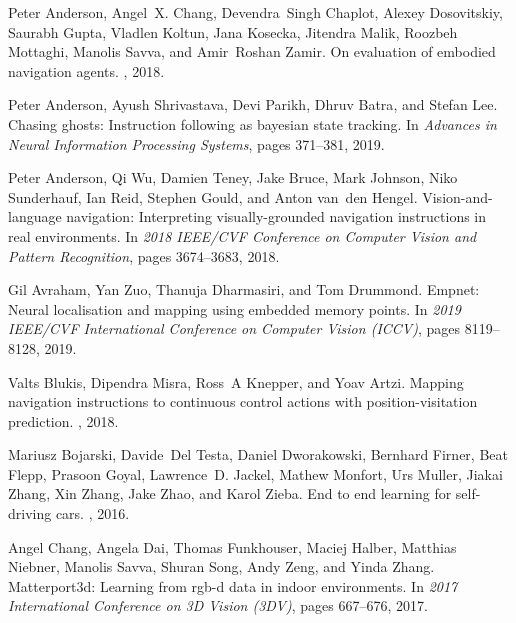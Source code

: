 \documentclass[final]{cvpr}
\begin{document}
\begin{thebibliography}{10}\itemsep=-1pt

    Peter {Anderson}, Angel~X. {Chang}, Devendra~Singh {Chaplot}, Alexey
      {Dosovitskiy}, Saurabh {Gupta}, Vladlen {Koltun}, Jana {Kosecka}, Jitendra
      {Malik}, Roozbeh {Mottaghi}, Manolis {Savva}, and Amir~Roshan {Zamir}.
    \newblock On evaluation of embodied navigation agents.
    , 2018.
    
    Peter {Anderson}, Ayush {Shrivastava}, Devi {Parikh}, Dhruv {Batra}, and Stefan
      {Lee}.
    \newblock Chasing ghosts: Instruction following as bayesian state tracking.
    \newblock In {\em Advances in Neural Information Processing Systems}, pages
      371--381, 2019.
    
    Peter {Anderson}, Qi {Wu}, Damien {Teney}, Jake {Bruce}, Mark {Johnson}, Niko
      {Sunderhauf}, Ian {Reid}, Stephen {Gould}, and Anton van~den {Hengel}.
    \newblock Vision-and-language navigation: Interpreting visually-grounded
      navigation instructions in real environments.
    \newblock In {\em 2018 IEEE/CVF Conference on Computer Vision and Pattern
      Recognition}, pages 3674--3683, 2018.
    
    Gil {Avraham}, Yan {Zuo}, Thanuja {Dharmasiri}, and Tom {Drummond}.
    \newblock Empnet: Neural localisation and mapping using embedded memory points.
    \newblock In {\em 2019 IEEE/CVF International Conference on Computer Vision
      (ICCV)}, pages 8119--8128, 2019.
    
    Valts Blukis, Dipendra Misra, Ross~A Knepper, and Yoav Artzi.
    \newblock Mapping navigation instructions to continuous control actions with
      position-visitation prediction.
    , 2018.
    
    Mariusz {Bojarski}, Davide~Del {Testa}, Daniel {Dworakowski}, Bernhard
      {Firner}, Beat {Flepp}, Prasoon {Goyal}, Lawrence~D. {Jackel}, Mathew
      {Monfort}, Urs {Muller}, Jiakai {Zhang}, Xin {Zhang}, Jake {Zhao}, and Karol
      {Zieba}.
    \newblock End to end learning for self-driving cars.
    , 2016.
    
    Angel {Chang}, Angela {Dai}, Thomas {Funkhouser}, Maciej {Halber}, Matthias
      {Niebner}, Manolis {Savva}, Shuran {Song}, Andy {Zeng}, and Yinda {Zhang}.
    \newblock Matterport3d: Learning from rgb-d data in indoor environments.
    \newblock In {\em 2017 International Conference on 3D Vision (3DV)}, pages
      667--676, 2017.
    

\end{thebibliography}
\end{document}
